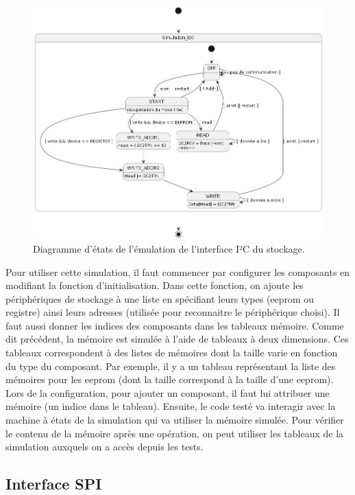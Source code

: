 \documentclass[a4paper]{article}
\begin{document}
\begin{figure}[h!]
  \begin{center}
    \includegraphics[scale=0.5]{./graphs/sm-i2c.png}
    \caption{Diagramme d'états de l'émulation de l'interface I²C du stockage.}
    \label{fig:machineetatsi2c}
  \end{center}
\end{figure}

Pour utiliser cette simulation, il faut commencer par configurer les composants
en modifiant la fonction d'initialisation. Dans cette fonction, on ajoute les
périphériques de stockage à une liste en spécifiant leurs types (eeprom ou
registre) ainsi leurs adresses (utilisée pour reconnaitre le périphérique
choisi). Il faut aussi donner les indices des composants dans les tableaux
mémoire. Comme dit précédent, la mémoire est simulée à l'aide de tableaux à deux
dimensions. Ces tableaux correspondent à des listes de mémoires dont la taille
varie en fonction du type du composant. Par exemple, il y a un tableau
représentant la liste des mémoires pour les eeprom (dont la taille correspond à
la taille d'une eeprom). Lors de la configuration, pour ajouter un composant, il
faut lui attribuer une mémoire (un indice dans le tableau). Ensuite, le code
testé va interagir avec la machine à états de la simulation qui va utiliser la
mémoire simulée. Pour vérifier le contenu de la mémoire après une opération, on
peut utiliser les tableaux de la simulation auxquels on a accès depuis les
tests.
\subsection{Interface SPI}%
\end{document}
